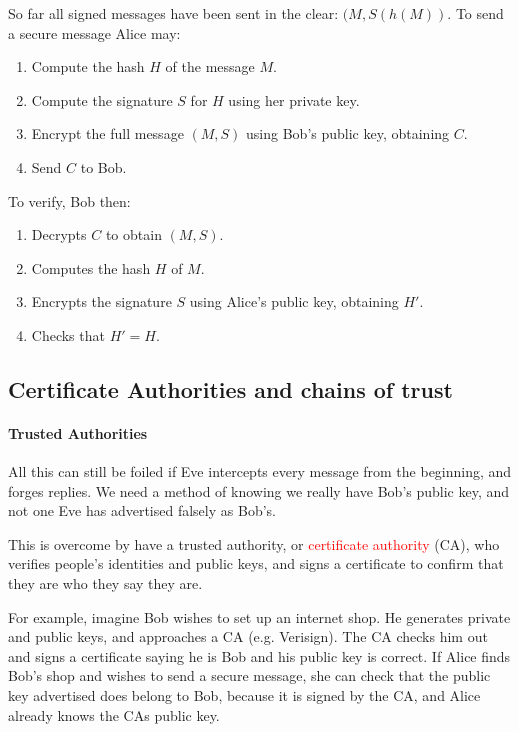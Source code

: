 \documentclass[a4paper, 11pt, openany]{book}
\numberwithin{equation}{section}
\theoremstyle{plain}
\theoremstyle{definition}
\newcommand{\Important}[1]{\textcolor{red}{#1}}
\begin{document}
So far all signed messages have been sent in the clear: $(M, S(h(M) )$. To send a secure message Alice may:
\begin{enumerate}
    \item Compute the hash $H$ of the message $M$.
    
    \item Compute the signature $S$ for $H$ using her private key.
    
    \item Encrypt the full message $(M,S)$ using Bob’s public key, obtaining $C$.
    
    \item Send $C$ to Bob.
\end{enumerate}

To verify, Bob then:
\begin{enumerate}
    \item Decrypts $C$ to obtain $(M,S)$.
    
    \item Computes the hash $H$ of $M$.
    
    \item Encrypts the signature $S$ using Alice’s public key, obtaining $H'$.
    
    \item Checks that $H' = H$.
\end{enumerate}

\subsection{Certificate Authorities and chains of trust}

\paragraph{Trusted Authorities}

All this can still be foiled if Eve intercepts every message from the beginning, and forges replies.
We need a method of knowing we really have Bob’s public key, and not one Eve has advertised falsely as Bob’s.

This is overcome by have a trusted authority, or \Important{certificate authority} (CA), who verifies people’s identities and public keys, and signs a certificate to confirm that they are who they say they are.

For example, imagine Bob wishes to set up an internet shop. He generates private and public keys, and approaches a CA (e.g. Verisign). The CA checks him out and signs a certificate saying he is Bob and his public key is correct. If Alice finds Bob’s shop and wishes to send a secure message, she can check that the public key advertised does belong to Bob, because it is signed by the CA, and Alice already knows the CAs public key.
\end{document}
